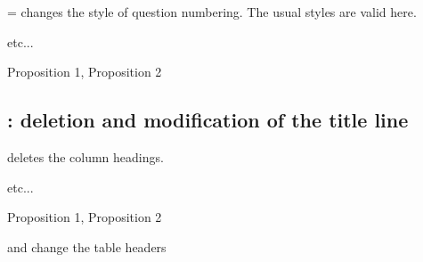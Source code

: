 \subsubsection{}   

= changes the style of question numbering. The usual styles are valid here.

\begin{minipage}[c][][t]{.45\linewidth}
\begin{tkzexample}
 \begin{alterqcm}[lq=3cm,numstyle=\alph]
   etc...
 \end{alterqcm}
\end{tkzexample}  
\end{minipage}
\hfill
\begin{minipage}[c][][t]{.45\linewidth}
  \begin{alterqcm}[lq=3cm,numstyle=\alph]
  {%
  {Proposition 1},
  {Proposition 2}}
  \end{alterqcm}
\end{minipage}       
 
\subsection{ : deletion and modification of the title line }

 deletes the column headings.

\begin{minipage}[c][][t]{.45\linewidth}
\begin{tkzexample}
  \begin{alterqcm}[lq=3cm,title=false]
  etc...
  \end{alterqcm}\end{tkzexample}
\end{minipage}\hfill
\begin{minipage}[c][][t]{.45\linewidth}
  \begin{alterqcm}[lq=3cm,title=false]
  {%
  {Proposition 1},
  {Proposition 2}%
  }
  \end{alterqcm}
\end{minipage}
                      

\medskip
{} and  change the table headers

